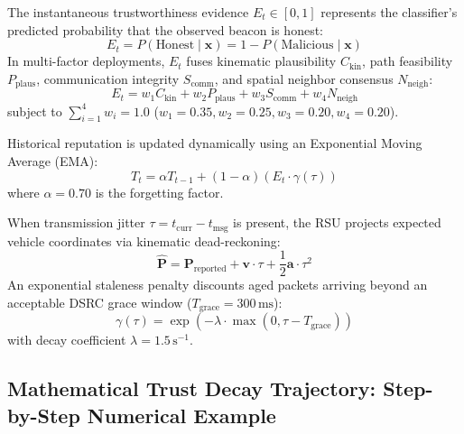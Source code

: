 \documentclass[conference]{IEEEtran}
\begin{document}
The instantaneous trustworthiness evidence $E_t \in [0, 1]$ represents the classifier's predicted probability that the observed beacon is honest:
\begin{equation}
E_t = P(\text{Honest} \mid \mathbf{x}) = 1 - P(\text{Malicious} \mid \mathbf{x})
\label{eq:evidence_def}
\end{equation}
In multi-factor deployments, $E_t$ fuses kinematic plausibility $C_{\text{kin}}$, path feasibility $P_{\text{plaus}}$, communication integrity $S_{\text{comm}}$, and spatial neighbor consensus $N_{\text{neigh}}$:
\begin{equation}
E_t = w_1 C_{\text{kin}} + w_2 P_{\text{plaus}} + w_3 S_{\text{comm}} + w_4 N_{\text{neigh}}
\label{eq:evidence_fusion}
\end{equation}
subject to $\sum_{i=1}^4 w_i = 1.0$ ($w_1 = 0.35, w_2 = 0.25, w_3 = 0.20, w_4 = 0.20$).

Historical reputation is updated dynamically using an Exponential Moving Average (EMA):
\begin{equation}
T_t = \alpha T_{t-1} + (1-\alpha) \left(E_t \cdot \gamma(\tau)\right)
\label{eq:ema_trust}
\end{equation}
where $\alpha = 0.70$ is the forgetting factor. 

When transmission jitter $\tau = t_{\text{curr}} - t_{\text{msg}}$ is present, the RSU projects expected vehicle coordinates via kinematic dead-reckoning:
\begin{equation}
\hat{\mathbf{P}} = \mathbf{P}_{\text{reported}} + \mathbf{v} \cdot \tau + \frac{1}{2}\mathbf{a}\cdot \tau^2
\label{eq:dead_reckoning}
\end{equation}
An exponential staleness penalty discounts aged packets arriving beyond an acceptable DSRC grace window ($T_{\text{grace}} = 300\,\text{ms}$):
\begin{equation}
\gamma(\tau) = \exp\left(-\lambda \cdot \max(0, \tau - T_{\text{grace}})\right)
\label{eq:staleness}
\end{equation}
with decay coefficient $\lambda = 1.5\,\text{s}^{-1}$.

\subsection{Mathematical Trust Decay Trajectory: Step-by-Step Numerical Example}
\end{document}

